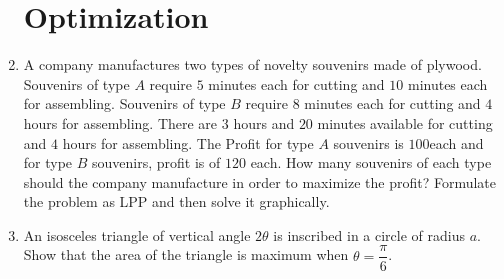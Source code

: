 \documentclass[12pt,-letter paper]{article}
\begin{document}
\begin{enumerate}

\section*{Optimization}

\item A company manufactures two types of novelty souvenirs made of plywood. Souvenirs of type $A$ require $5$ minutes each for cutting and $10$ minutes each for assembling. Souvenirs of type $B$ require $8$ minutes each for cutting and $4$ hours for assembling. There are $3$ hours and $20$ minutes available for cutting and $4$ hours for assembling. The Profit for type $A$ souvenirs is \rupee$100$each and for type $B$ souvenirs, profit is of \rupee$120$ each. How many souvenirs of each type should the company manufacture in order to maximize the profit? Formulate the problem as LPP and then solve it graphically.

\item An isosceles triangle of vertical angle $2\theta$ is inscribed in a circle  of radius $a$. Show that the area of the triangle is maximum when $\theta =\dfrac{\pi}{6}$.
\end{enumerate}      
\end{document}
